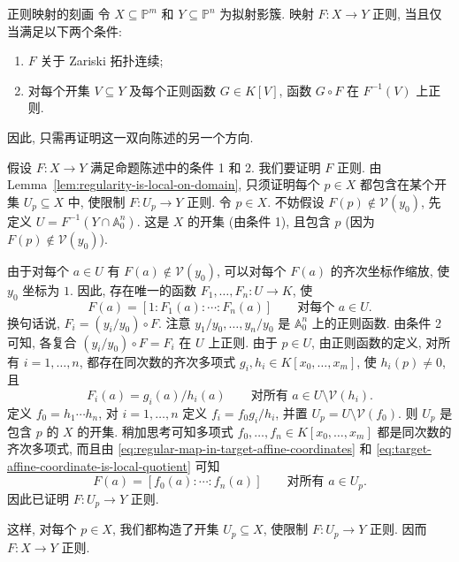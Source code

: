 \begin{Proposition}{正则映射的刻画}\leavevmode\label{prop:characterize-regular-maps-by-continuity-and-pullback}
令 $X\subseteq\mathbb{P}^{m}$ 和 $Y\subseteq\mathbb{P}^{n}$ 为拟射影簇. 映射 $F:X\to Y$ 正则, 当且仅当满足以下两个条件:
\begin{enumerate}[label=\arabic*.]
  \item $F$ 关于 Zariski 拓扑连续;
  \item 对每个开集 $V\subseteq Y$ 及每个正则函数 $G\in K[V]$, 函数 $G\circ F$ 在 $F^{-1}(V)$ 上正则.
\end{enumerate}
\end{Proposition}
\begin{Proof}
因此, 只需再证明这一双向陈述的另一个方向.

假设 $F:X\to Y$ 满足命题陈述中的条件 1 和 2. 我们要证明 $F$ 正则. 由 Lemma~\ref{lem:regularity-is-local-on-domain}, 只须证明每个 $p\in X$ 都包含在某个开集 $U_{p}\subseteq X$ 中, 使限制 $F:U_{p}\to Y$ 正则. 令 $p\in X$. 不妨假设 $F(p)\notin\mathcal{V}(y_{0})$, 先定义 $U=F^{-1}(Y\cap\mathbb{A}^{n}_{0})$. 这是 $X$ 的开集 (由条件 1), 且包含 $p$ (因为 $F(p)\notin\mathcal{V}(y_{0})$).

由于对每个 $a\in U$ 有 $F(a)\notin\mathcal{V}(y_{0})$, 可以对每个 $F(a)$ 的齐次坐标作缩放, 使 $y_{0}$ 坐标为 $1$. 因此, 存在唯一的函数 $F_{1},\ldots,F_{n}:U\to K$, 使
\begin{equation}\label{eq:regular-map-in-target-affine-coordinates}
  F(a)=[1:F_{1}(a):\cdots:F_{n}(a)]\qquad\text{对每个 }a\in U.
\end{equation}
换句话说, $F_{i}=(y_{i}/y_{0})\circ F$. 注意 $y_{1}/y_{0},\ldots,y_{n}/y_{0}$ 是 $\mathbb{A}^{n}_{0}$ 上的正则函数. 由条件 2 可知, 各复合 $(y_{i}/y_{0})\circ F=F_{i}$ 在 $U$ 上正则. 由于 $p\in U$, 由正则函数的定义, 对所有 $i=1,\ldots,n$, 都存在同次数的齐次多项式 $g_{i},h_{i}\in K[x_{0},\ldots,x_{m}]$, 使 $h_{i}(p)\ne0$, 且
\begin{equation}\label{eq:target-affine-coordinate-is-local-quotient}
  F_{i}(a)=g_{i}(a)/h_{i}(a)
  \qquad\text{对所有 }a\in U\setminus\mathcal{V}(h_{i}).
\end{equation}
定义 $f_{0}=h_{1}\cdots h_{n}$, 对 $i=1,\ldots,n$ 定义 $f_{i}=f_{0}g_{i}/h_{i}$, 并置 $U_{p}=U\setminus\mathcal{V}(f_{0})$. 则 $U_{p}$ 是包含 $p$ 的 $X$ 的开集. 稍加思考可知多项式 $f_{0},\ldots,f_{n}\in K[x_{0},\ldots,x_{m}]$ 都是同次数的齐次多项式, 而且由 \eqref{eq:regular-map-in-target-affine-coordinates} 和 \eqref{eq:target-affine-coordinate-is-local-quotient} 可知
\[
  F(a)=[f_{0}(a):\cdots:f_{n}(a)]\qquad\text{对所有 }a\in U_{p}.
\]
因此已证明 $F:U_{p}\to Y$ 正则.

这样, 对每个 $p\in X$, 我们都构造了开集 $U_{p}\subseteq X$, 使限制 $F:U_{p}\to Y$ 正则. 因而 $F:X\to Y$ 正则.
\end{Proof}

